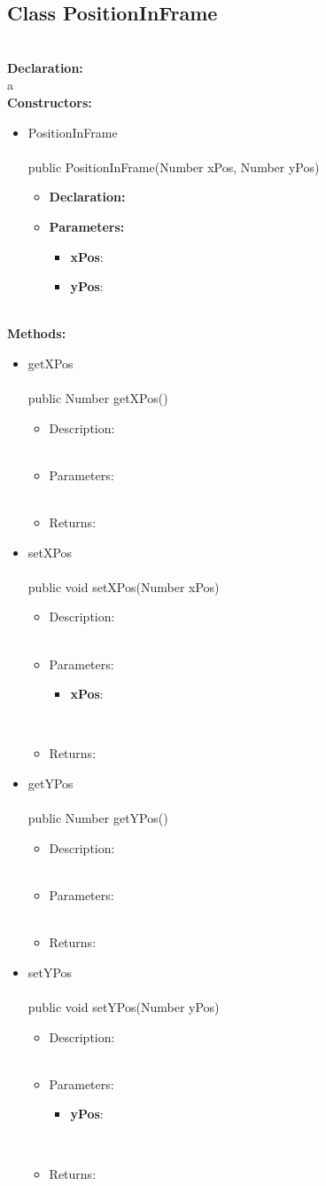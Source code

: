 \documentclass[10pt,a4paper]{report}
\newcommand{\public}{\textcolor{col:public}{public }}
\newcommand{\type}[1]{\textcolor{col:class}{#1}}
\newcommand{\methoddesc}[8]{
#4
\leavevmode \\
\leavevmode \\
#1#2\type{#3} #4(#5)
\begin{itemize}[label=-]
    \item Description: \leavevmode \\ #6 \leavevmode \\
    \item Parameters: \leavevmode \\ #7 \leavevmode \\
    \item Returns: \leavevmode \\ #8
\end{itemize}
}
\newcommand{\paramdesc}[2]{
    \textbf{#1}: #2
}
\newcommand{\constrdesc}[5]{
#2
\leavevmode \\
\leavevmode \\
#1#2(#3) \leavevmode \\
\begin{itemize}[label=-]
    \item \textbf{Declaration:} \leavevmode \\ #4
    \item \textbf{Parameters:} \leavevmode \\ #5
\end{itemize}
}
\newcommand{\desc}[3]{
    #1{#2 #3}
}
\newcommand{\classdesc}[4]{
    \desc{\subsection}{Class}{#1} \leavevmode \\
    \textbf{Declaration:} \leavevmode \\
    #2 \leavevmode \\
    \textbf{Constructors:} \leavevmode \\
    #3 \leavevmode \\
    \textbf{Methods:} \leavevmode \\
    #4
}
\begin{document}
\classdesc{PositionInFrame}{a}{
    \begin{itemize}
        \item \constrdesc{\public}{PositionInFrame}{\type{Number} xPos, \type{Number} yPos}{}{
            \begin{itemize}
                \item \paramdesc{xPos}{}
                \item \paramdesc{yPos}{}
            \end{itemize}
        }
    \end{itemize}
}{
    \begin{itemize}
        \item \methoddesc{\public}{}{Number}{getXPos}{}
        {}{}{}
        \item \methoddesc{\public}{}{void}{setXPos}{\type{Number} xPos}
        {}{
            \begin{itemize}
                \item \paramdesc{xPos}{}
            \end{itemize}
        }{}
        \item \methoddesc{\public}{}{Number}{getYPos}{}
        {}{}{}
        \item \methoddesc{\public}{}{void}{setYPos}{\type{Number} yPos}
        {}{
            \begin{itemize}
                \item \paramdesc{yPos}{}
            \end{itemize}
        }{}
    \end{itemize}
}
\end{document}
